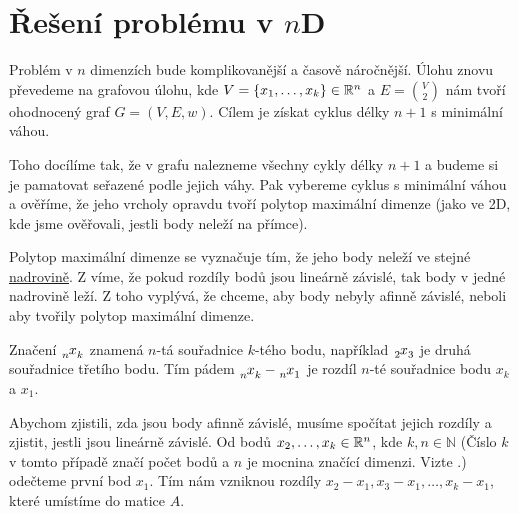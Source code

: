 



\section{Řešení problému v \texorpdfstring{$n$D}{nD}}
\label{sec:reseni_1D}
Problém v $n$ dimenzích bude komplikovanější a časově náročnější. Úlohu znovu převedeme na grafovou úlohu, kde $V = \{x_1,\ldots, x_k\} \in \mathbb{R}^n$ a $E = \binom{V}{2}$ nám tvoří ohodnocený graf $G = (V, E, w)$. Cílem je získat cyklus délky $n+1$ s minimální váhou.

Toho docílíme tak, že v grafu nalezneme všechny cykly délky $n+1$ a budeme si je pamatovat seřazené podle jejich váhy. Pak vybereme cyklus s minimální váhou a ověříme, že jeho vrcholy opravdu tvoří polytop maximální dimenze (jako ve 2D, kde jsme ověřovali, jestli body neleží na přímce).

Polytop maximální dimenze se vyznačuje tím, že jeho body neleží ve stejné \hyperref[definice:nadrovina]{nadrovině}. Z  víme, že pokud rozdíly bodů jsou lineárně závislé, tak body v jedné nadrovině leží. Z toho vyplývá, že chceme, aby body nebyly afinně závislé, neboli aby tvořily polytop maximální dimenze.  

\begin{poznamka} 
  \label{poznamka:varovani_index}
  Značení $\x{n}{k}$ znamená $n$-tá souřadnice $k$-tého bodu, například $\x{2}{3}$ je druhá souřadnice třetího bodu. Tím pádem $\x{n}{k} - \x{n}{1}$ je rozdíl $n$-té souřadnice bodu $x_k$ a $x_1$. 
\end{poznamka}

Abychom zjistili, zda jsou body afinně závislé, musíme spočítat jejich rozdíly a zjistit, jestli jsou lineárně závislé. Od bodů $x_2, \ldots, x_k \in \mathbb{R}^n$, kde  $k, n \in \mathbb{N}$ (Číslo $k$ v tomto případě značí počet bodů a $n$ je mocnina značící dimenzi. Vizte .) odečteme první bod $x_1$. Tím nám vzniknou rozdíly $x_2-x_1, x_3-x_1, \dots, x_k-x_1$, které umístíme do matice $A$. 

